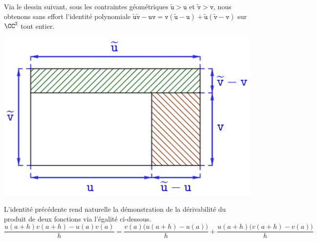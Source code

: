 \begin{example}
    Via le dessin suivant, sous les contraintes géométriques
    $\widetilde{\mathtt{u}} > \mathtt{u}$
    et
    $\widetilde{\mathtt{v}} > \mathtt{v}$,
    nous obtenons sans effort l'identité polynomiale
    $ \widetilde{\mathtt{u}} \widetilde{\mathtt{v}}
    - \mathtt{u} \mathtt{v}
    = \mathtt{v} ( \widetilde{\mathtt{u}} - \mathtt{u} )
    + \widetilde{\mathtt{u}} ( \widetilde{\mathtt{v}} - \mathtt{v} )$
    sur $\CC^2$ tout entier.

	\begin{center}
		\includegraphics[scale=.75]{proder.png}
	\end{center}
    
    L'identité précédente rend naturelle la démonstration de la dérivabilité du produit de deux fonctions via l'égalité ci-dessous.
    \[
          \frac{u(a+h) v(a+h) - u(a) v(a)}{h}
        = \frac{v(a) \big( u(a+h) - u(a) \big)}{h} 
        + \frac{u(a+h) \big( v(a+h) - v(a) \big)}{h}
    \]
\end{example}
